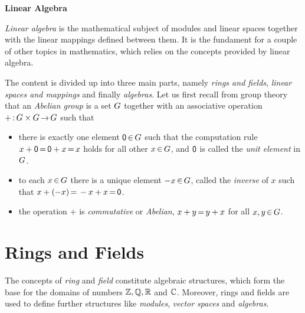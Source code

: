 \documentclass[11pt,twoside]{article}
\begin{document}
\thispagestyle{empty}

\def\Title{Linear Algebra}

\centerline{\large{\textbf{\Title}}}
\vspace{4pt}
\centerline{\small{\textsc{\Author}}}
\vspace{10pt}



\fancyhead[OL]{\small{\thepage}}
\fancyhead[ER]{\small{\thepage}}
\fancyhead[OC]{\small{\textsc{\Title}}}

\setcounter{page}{1}
\textit{Linear algebra} is the mathematical subject of modules and linear spaces
together with the linear mappings defined between them.
It is the fundament for a couple of other topics in mathematics,
which relies on the concepts provided by linear algebra.

\subparagraph{}
The content is divided up into three main parts,
namely \textit{rings and fields}, \textit{linear spaces and mappings}
and finally \textit{algebras}.
Let us first recall from group theory
that an \textit{Abelian group} is a set $G$ together
with an associative operation $+ {\,:\,}G \times G {\,\to\,} G$
such that

\begin{itemize}[leftmargin=15pt]
\item[1.]
there is exactly one element ${\mathsf{0}} {\,\in\,} G$
such that the computation rule
$x + {\mathsf{0}} {\,=\,} {\mathsf{0}} + x {\,=\,} x$ holds for all other $x {\,\in\,} G$,
and ${\mathsf{0}}$ is called the \textit{unit element} in $G$.

\item[2.]
to each $x {\,\in\,} G$ there is a unique element $-x {\,\in\,} G$,
called the \textit{inverse} of $x$
such that $x + (-x) {\,=\,} -x + x {\,=\,} {\mathsf{0}}$.

\item[3.]
the operation $+$ is \textit{commutative} or \textit{Abelian},
{\ie} $x+y {\,=\,} y+x$ for all $x,y {\,\in\,} G$.
\end{itemize}

\part{Rings and Fields}                                                        %
The concepts of \textit{ring} and \textit{field}
constitute algebraic structures,
which form the base for the domains of numbers ${\mathbb{Z}}, {\mathbb{Q}}, {\mathbb{R}}$ and ${\mathbb{C}}$.
Moreover,
rings and fields are used to define further structures
like \textit{modules}, \textit{vector spaces} and \textit{algebras}.
\end{document}
